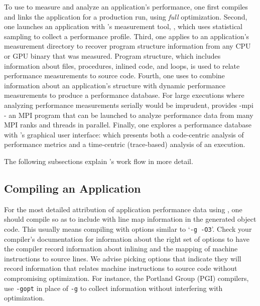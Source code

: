\documentclass[11pt,twoside,letterpaper]{report}
\begin{document}
To use \HPCToolkit{} to measure and analyze an application's performance, one first compiles and links the application for a production run, using \emph{full} optimization.
Second, one launches an application with \HPCToolkit{}'s measurement tool, \hpcrun{}, which uses statistical sampling to collect a performance profile.
Third, one applies \hpcstruct{} to an application's measurement directory to recover program structure information from any CPU or GPU binary that was measured. 
Program structure, which includes information about files, procedures, inlined code, and loops, is used to relate performance measurements to source code. 
Fourth, one uses \hpcprof{} to combine information about an application's structure with dynamic performance measurements to produce a performance database.
For large executions where analyzing performance measurements serially would be imprudent, \HPCToolkit{}  provides \hpcprof-mpi{} - an MPI program that can be launched to analyze  performance data from many MPI ranks and threads in parallel.
Finally, one explores a performance database with \HPCToolkit{}'s graphical user interface: \hpcviewer{} which presents
both a code-centric analysis of performance metrics and a time-centric (trace-based) analysis of an execution.

The following subsections explain \HPCToolkit{}'s work flow in more detail.



\subsection{Compiling an Application}

For the most detailed attribution of application performance data using \HPCToolkit{}, one should compile so as to include with line map information in the generated object code.
This usually means compiling with options similar to `\texttt{-g -O3}'. Check your compiler's documentation for information about the right set of options to have the compiler record information about inlining and the mapping of machine instructions to source lines. We advise picking  options that indicate they will record information that relates machine instructions to source code without compromising optimization. For instance, the Portland Group (PGI) compilers, use \texttt{-gopt} in place of \texttt{-g} to collect information without interfering with optimization.
\end{document}
